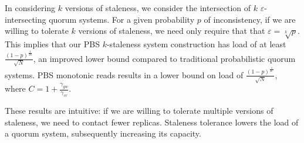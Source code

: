 \documentclass{vldb}
\begin{document}
In considering $k$ versions of staleness, we consider the intersection
of $k$ $\varepsilon$-intersecting quorum systems.  For a given
probability $p$ of inconsistency, if we are willing to tolerate $k$
versions of staleness, we need only require that that $\varepsilon =
\sqrt[k]{p}$.  This implies that our PBS $k$-staleness system
construction has load of at least
$\frac{(1-p)^{\frac{1}{2k}}}{\sqrt{N}}$, an improved lower bound
compared to traditional probabilistic quorum systems.  PBS monotonic
reads results in a lower bound on load of
$\frac{(1-p)^{\frac{1}{2C}}}{\sqrt{N}}$, where
$C=1+\frac{\gamma_{gw}}{\gamma_{cr}}$.

These results are intuitive: if we are willing to tolerate multiple
versions of staleness, we need to contact fewer replicas.  Staleness
tolerance lowers the load of a quorum system, subsequently increasing
its capacity.
\end{document}
